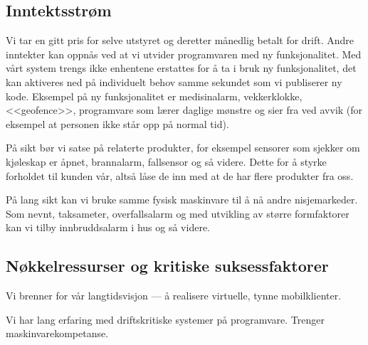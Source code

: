 \subsection{Inntektsstrøm}


Vi tar en gitt pris for selve utstyret og deretter månedlig betalt for drift.
Andre inntekter kan oppnås ved at vi utvider programvaren med ny
funksjonalitet. Med vårt system trengs ikke enhentene erstattes for å ta i bruk
ny funksjonalitet, det kan aktiveres ned på individuelt behov samme sekundet
som vi publiserer ny kode.  Eksempel på ny funksjonalitet er medisinalarm,
vekkerklokke, <<geofence>>, programvare som lærer daglige mønstre og sier fra
ved avvik (for eksempel at personen ikke står opp på normal tid).

På sikt bør vi satse på relaterte produkter, for eksempel sensorer som sjekker
om kjøleskap er åpnet, brannalarm, fallsensor og så videre. Dette for å styrke
forholdet til kunden vår, altså låse de inn med at de har flere produkter fra
oss.

På lang sikt kan vi bruke samme fysisk maskinvare til å nå andre nisjemarkeder.
Som nevnt, taksameter, overfallsalarm og med utvikling av større formfaktorer
kan vi tilby innbruddsalarm i hus og så videre.

\subsection{Nøkkelressurser og kritiske suksessfaktorer}



Vi brenner for vår langtidsvisjon --- å realisere virtuelle, tynne
mobilklienter.

Vi har lang erfaring med driftskritiske systemer på programvare. Trenger
maskinvarekompetanse.%

